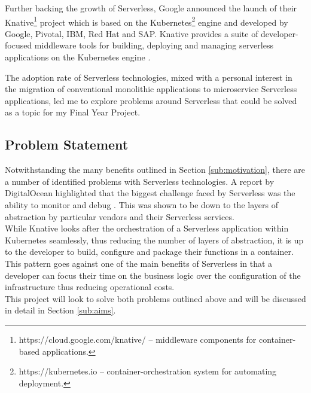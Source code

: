 Further backing the growth of \gls{Serverless}, Google announced the launch of their \gls{Knative}\footnote{https://cloud.google.com/knative/ -- middleware components for container-based applications.} project which is based on the \gls{Kubernetes}\footnote{https://kubernetes.io -- container-orchestration system for automating deployment.} engine and developed by Google, Pivotal, IBM, Red Hat and SAP. Knative provides a suite of developer-focused middleware tools for building, deploying and managing serverless applications on the \gls{Kubernetes} engine \citep{bryant_2018}.

The adoption rate of \gls{Serverless} technologies, mixed with a personal interest in the migration of conventional monolithic applications to microservice \gls{Serverless} applications, led me to explore problems around \gls{Serverless} that could be solved as a topic for my Final Year Project.

\subsection{Problem Statement}
\label{sub:problem}
Notwithstanding the many benefits outlined in Section \ref{sub:motivation}, there are a number of identified problems with \gls{Serverless} technologies. A report by DigitalOcean highlighted that the biggest challenge faced by \gls{Serverless} was the ability to monitor and debug \citep{digitalocean_2018}. This was shown to be down to the layers of abstraction by particular vendors and their \gls{Serverless} services.
\\While \gls{Knative} looks after the orchestration of a \gls{Serverless} application within \gls{Kubernetes} seamlessly, thus reducing the number of layers of abstraction, it is up to the developer to build, configure and package their functions in a container. This pattern goes against one of the main benefits of \gls{Serverless} in that a developer can focus their time on the business logic over the configuration of the infrastructure thus reducing operational costs.
\\This project will look to solve both problems outlined above and will be discussed in detail in Section \ref{sub:aims}.

